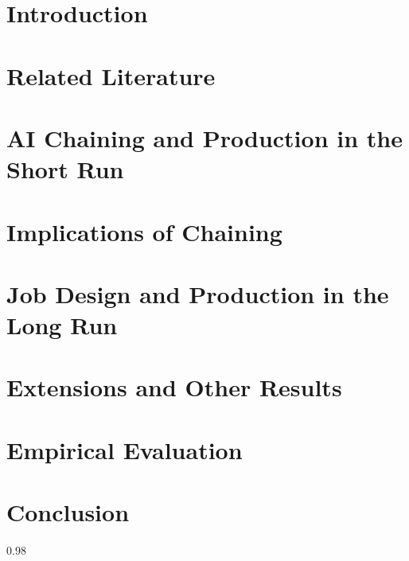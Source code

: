 \documentclass[12pt, final]{article}
\begin{document}
\setcounter{page}{1}

\section{Introduction}


\section{Related Literature}


\section{AI Chaining and Production in the Short Run} \label{sec:shortrun}


\section{Implications of Chaining} \label{sec:results}


\section{Job Design and Production in the Long Run} \label{sec:longrun}


\section{Extensions and Other Results} \label{sec:extensions}


\section{Empirical Evaluation} \label{sec:empirics}


\section{Conclusion}


\clearpage


\setlength{\bibsep}{0ex}
\begin{spacing}{0.98}

\end{spacing}

\newpage
\appendix
\newpage
\end{document}
